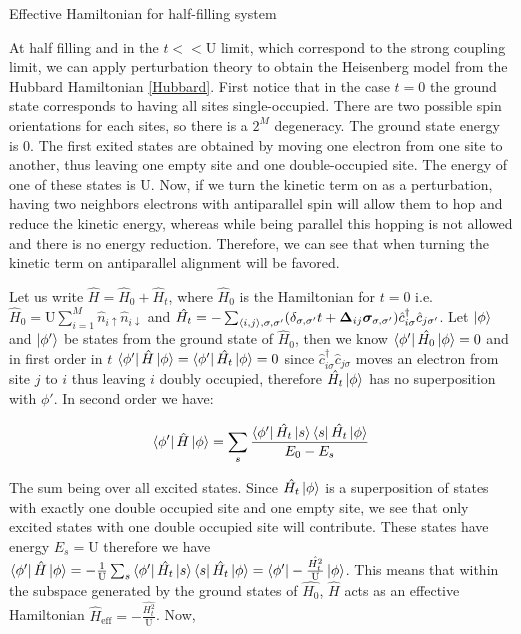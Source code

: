 \begin{section}{Effective Hamiltonian for half-filling system}

At half filling and in the $t << \text{U}$ limit, which correspond to the strong coupling limit, we can apply perturbation theory to obtain the Heisenberg model from the Hubbard Hamiltonian \ref{Hubbard}. First notice that in the case $t = 0$ the ground state corresponds to having all sites single-occupied. There are two possible spin orientations for each sites, so there is a $2^M$ degeneracy. The ground state energy is $0$. The first exited states are obtained by moving one electron from one site to another, thus leaving one empty site and one double-occupied site. The energy of one of these states is $\text{U}$. Now, if we turn the kinetic term on as a perturbation, having two neighbors electrons with antiparallel spin will allow them to hop and reduce the kinetic energy, whereas while being parallel this hopping is not allowed and there is no energy reduction. Therefore, we can see that when turning the kinetic term on antiparallel alignment will be favored. 

Let us write $\hat{H} = \hat{H}_0 + \hat{H}_t$, where $\hat{H}_0$ is the Hamiltonian for $t=0$ i.e. $\hat{H}_0 = \text{U} \sum_{i=1}^M \hat{n}_{i\uparrow}\hat{n}_{i\downarrow}$ and $\hat{H_t} = -\sum_{\langle i,j \rangle, \sigma, \sigma'}(\delta_{\sigma, \sigma'} t + \boldsymbol{\Delta}_{ij} \boldsymbol{\sigma}_{\sigma, \sigma'})\hat{c}_{i \sigma}^\dagger \hat{c}_{j \sigma'}$. Let $\ket{\phi}$ and $\ket{\phi'}$ be states from the ground state of $\hat{H}_0$, then we know $\bra{\phi'} \hat{H_0} \ket{\phi} = 0$ and in first order in $t$ $\bra{\phi'} \hat{H} \ket{\phi} = \bra{\phi'} \hat{H_t} \ket{\phi} = 0$ since $\hat{c}_{i \sigma}^\dagger \hat{c}_{j \sigma}$ moves an electron from site $j$ to $i$ thus leaving $i$ doubly occupied, therefore $\hat{H_t} \ket{\phi}$ has no superposition with $\phi'$. In second order we have:

\begin{equation}
\bra{\phi'} \hat{H} \ket{\phi} = \sum_s \frac{\bra{\phi'} \hat{H_t} \ket{s}\bra{s} \hat{H_t} \ket{\phi}}{E_0-E_s}
\end{equation}

The sum being over all excited states. Since $\hat{H_t}\ket{\phi}$ is a superposition of states with exactly one double occupied site and one empty site, we see that only excited states with one double occupied site will contribute. These states have energy $E_s = \text{U}$ therefore we have $\bra{\phi'} \hat{H} \ket{\phi} = -\frac{1}{\text{U}}\sum_s \bra{\phi'} \hat{H_t} \ket{s}\bra{s} \hat{H_t} \ket{\phi} = \bra{\phi'} -\frac{\hat{H_t^2}}{\text{U}} \ket{\phi}$. This means that within the subspace generated by the ground states of $\hat{H_0}$, $\hat{H}$ acts as an effective Hamiltonian $\hat{H}_{\text{eff}} = -\frac{\hat{H_t^2}}{\text{U}}$. Now,


\end{section}
